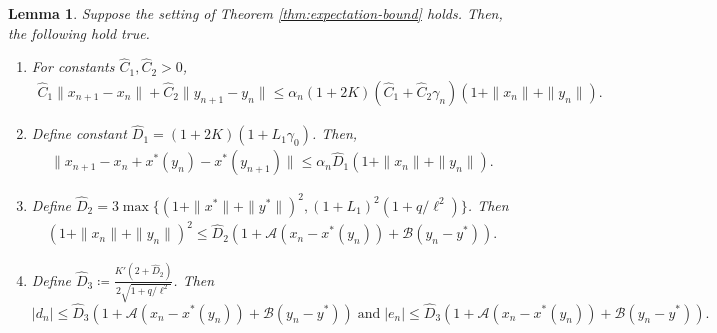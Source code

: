 \documentclass[letterpaper, 10 pt, conference]{ieeeconf}  %
\theoremstyle{definition}
\theoremstyle{plain}
\newtheorem{lemma}{Lemma}
\newcommand{\xstar}{x^*}
\newcommand{\ystar}{y^*}
\newcommand{\hC}{\hat{C}}
\newcommand{\hD}{\hat{D}}
\newcommand{\Acal}{\mathcal{A}}
\newcommand{\Bcal}{\mathcal{B}}
\begin{document}
\begin{lemma}\label{lem:inter-bounds}
    Suppose the setting of Theorem \ref{thm:expectation-bound} holds. Then, the following hold true.
    \begin{enumerate}[label=(\alph*)]
        \item \label{lem-part:gen-diff-bound} For constants $\hC_1,\hC_2>0$, 
        \begin{align*}
        \hC_1\|x_{n+1}-x_n\|+\hC_2\|y_{n+1}-y_n\|\leq \alpha_n(1+2K)\left(\hC_1+\hC_2\gamma_n\right)(1+\|x_n\|+\|y_n\|).
        \end{align*}
        \item \label{lem-part:x-diff-bound} Define constant $\hD_1=(1+2K)(1+L_1\gamma_0)$. Then,
        \begin{align*}
        \|x_{n+1}-x_n+\xstar(y_n)-\xstar(y_{n+1})\|\leq \alpha_n\hD_1(1+\|x_n\|+\|y_n\|).
        \end{align*} 
        \item \label{lem-part:crude-bound} Define $\hD_2=3\max\{(1+\|x^*\|+\|y^*\|)^2,(1+L_1)^2(1+q/\ell^2)\}$. Then
    \begin{align*}
        (1+\|x_n\|+\|y_n\|)^2\leq \hD_2(1+\Acal(x_n-x^*(y_n))+\Bcal(y_n-y^*)).
    \end{align*}
    \item \label{lem-part:telescoping-diff-bound}Define $\hD_3\coloneqq\frac{K'(2+\hD_2)}{2\sqrt{1+q/\ell^2}}$. Then $$|d_n|\leq \hD_3(1+\Acal(x_n-\xstar(y_n))+\Bcal(y_n-\ystar))\;\text{and}\;|e_n|\leq \hD_3(1+\Acal(x_n-\xstar(y_n))+\Bcal(y_n-\ystar)).$$
    \end{enumerate}
\end{lemma}
\end{document}
